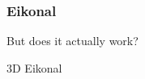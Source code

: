 \documentclass[aspectratio=169,xcolor=dvipsnames,11pt]{beamer}
\begin{document}
\begin{frame}\frametitle{Eikonal}
{\Large
{\color{Maroon}
But does it actually work?
}
}
\end{frame}


\begin{frame}{3D Eikonal}
\end{frame}


\end{document}
